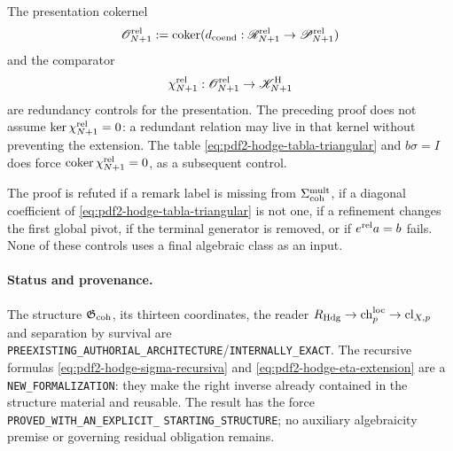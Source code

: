 The presentation cokernel
\begin{equation}\label{eq:pdf2-hodge-o-rel}
 \mathscr O_{N+1}^{\rm rel}:=\operatorname{coker}
 (d_{\rm coend}:\mathscr R_{N+1}^{\rm rel}\to
                  \mathscr P_{N+1}^{\rm rel})
\end{equation}
and the comparator
\begin{equation}\label{eq:pdf2-hodge-chi-rel}
 \chi_{N+1}^{\rm rel}:\mathscr O_{N+1}^{\rm rel}\to
 \mathscr K^{\rm H}_{N+1}
\end{equation}
are redundancy controls for the presentation. The preceding proof
does not assume $\ker\chi_{N+1}^{\rm rel}=0$: a redundant relation may live
in that kernel without preventing the extension. The table
\eqref{eq:pdf2-hodge-tabla-triangular} and
$b\sigma=I$ does force
$\operatorname{coker}\chi_{N+1}^{\rm rel}=0$, as a subsequent control.

\begin{falsifier}
The proof is refuted if a remark label is missing from $\Sigma_{\rm coh}^{\rm mult}$, if a diagonal coefficient of \eqref{eq:pdf2-hodge-tabla-triangular} is not one, if a refinement changes the first global pivot, if the terminal generator is removed, or if $e^{\rm rel}a=b$ fails. None of these controls uses a final algebraic class as an input.
\end{falsifier}

\paragraph{Status and provenance.}
The structure $\mathfrak G_{\rm coh}$, its thirteen coordinates, the reader
$R_{\rm Hdg}\to\operatorname{ch}^{\rm loc}_p\to\operatorname{cl}_{X,p}$
and separation by survival are
\texttt{PREEXISTING\_AUTHORIAL\_ARCHITECTURE}/\texttt{INTERNALLY\_EXACT}.
The recursive formulas
\eqref{eq:pdf2-hodge-sigma-recursiva} and
\eqref{eq:pdf2-hodge-eta-extension} are a
\texttt{NEW\_FORMALIZATION}: they make the right inverse
already contained in the structure material and reusable. The result has the force
\texttt{PROVED\_WITH\_AN\_EXPLICIT\_}\allowbreak
\texttt{STARTING\_STRUCTURE}; no auxiliary
algebraicity premise or governing residual obligation remains.
